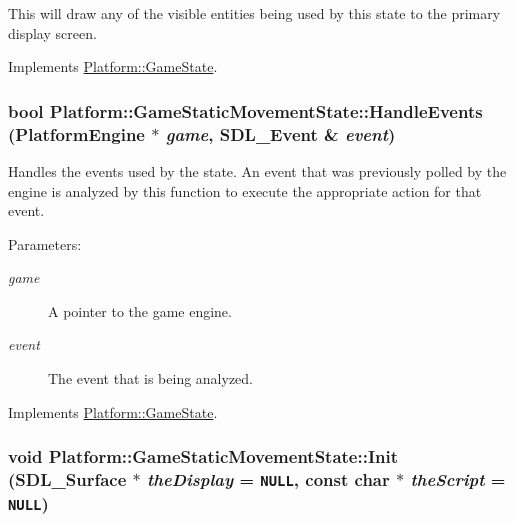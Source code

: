 This will draw any of the visible entities being used by this state to the primary display screen. 

Implements \hyperlink{class_platform_1_1_game_state_a864d8c7f6094afd421a516729e3dd95}{Platform::GameState}.\hypertarget{class_platform_1_1_game_static_movement_state_aa0e9df9b7b26c71096d60debf92774b}{
\subsubsection[{HandleEvents}]{\setlength{\rightskip}{0pt plus 5cm}bool Platform::GameStaticMovementState::HandleEvents ({\bf PlatformEngine} $\ast$ {\em game}, \/  SDL\_\-Event \& {\em event})}}
\label{db/d55/class_platform_1_1_game_static_movement_state_aa0e9df9b7b26c71096d60debf92774b}


Handles the events used by the state. An event that was previously polled by the engine is analyzed by this function to execute the appropriate action for that event.

\begin{Desc}
\item[Parameters:]
\begin{description}
\item[{\em game}]A pointer to the game engine. \item[{\em event}]The event that is being analyzed. \end{description}
\end{Desc}


Implements \hyperlink{class_platform_1_1_game_state_9edb3c6ed58b5a6c0b40cb07b01e5f31}{Platform::GameState}.\hypertarget{class_platform_1_1_game_static_movement_state_751b633b6a42bf1a85a9081f31dac4e1}{
\subsubsection[{Init}]{\setlength{\rightskip}{0pt plus 5cm}void Platform::GameStaticMovementState::Init (SDL\_\-Surface $\ast$ {\em theDisplay} = {\tt NULL}, \/  const char $\ast$ {\em theScript} = {\tt NULL})}}
\label{db/d55/class_platform_1_1_game_static_movement_state_751b633b6a42bf1a85a9081f31dac4e1}


